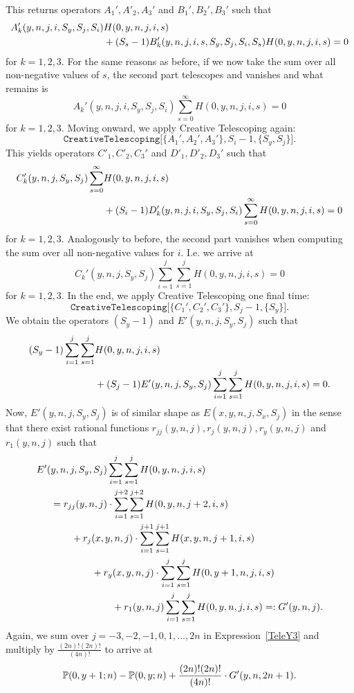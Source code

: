 \documentclass{amsart}
\numberwithin{equation}{section}
\begin{document}
This returns operators $A_1',A'_2,A_3'$ and $B_1',B_2',B_3'$ such that
\begin{align}
      A_k'(y,n,j,i,S_y,S_j,S_i)&H(0,y,n,j,i,s)\notag\\
    &{}+(S_s-1)B_k'(y,n,j,i,s,S_y,S_j,S_i,S_s)H(0,y,n,j,i,s)=0 \notag
\end{align}
for $k=1,2,3$. For the same reasons as before, if we now take the sum over all non-negative values of $s$, the second part telescopes and vanishes and what remains is
\[A_k'(y,n,j,i,S_y,S_j,S_i)\sum_{s=0}^\infty H(0,y,n,j,i,s)=0\]
for $k=1,2,3$. Moving onward, we apply Creative Telescoping again:
\[\texttt{CreativeTelescoping[}\{A_1',A_2',A_3'\},S_i-1,\{S_y,S_j\}\texttt{]}.\]
This yields operators $C'_1,C'_2,C_3'$ and $D'_1,D'_2,D_3'$ such that 
\begin{align}
    C_k'(y,n,j,S_y,S_j)\sum_{s=0}^\infty &H(0,y,n,j,i,s)\notag\\
    &+(S_i-1)D_k'(y,n,j,i,S_y,S_j,S_i)\sum_{s=0}^\infty H(0,y,n,j,i,s)=0\notag
\end{align}
for $k=1,2,3$. Analogously to before, the second part vanishes when computing the sum over all non-negative values for $i$. I.e. we arrive at
\[C_k'(y,n,j,S_y,S_j)\sum_{i=1}^j\sum_{s=1}^jH(0,y,n,j,i,s)=0\]
for $k=1,2,3$. In the end, we apply Creative Telescoping one final time:
\[\texttt{CreativeTelescoping[}\{C_1',C_2',C_3'\},S_j-1,\{S_y\}\texttt{]}.\]
We obtain the operators $(S_y-1)$ and $E'(y,n,j,S_y,S_j)$ such that
\begin{align}
    (S_y-1)\sum_{i=1}^j\sum_{s=1}^j &H(0,y,n,j,i,s)\notag\\
    &+(S_j-1)E'(y,n,j,S_y,S_j)\sum_{i=1}^j\sum_{s=1}^j H(0,y,n,j,i,s)=0. \label{TeleY3}
\end{align}
Now, $E'(y,n,j,S_y,S_j)$ is of similar shape as $E(x,y,n,j,S_x,S_j)$ in the sense that there exist rational functions $r_{jj}(y,n,j),r_j(y,n,j),r_y(y,n,j)$ and $r_1(y,n,j)$ such that
\begin{align}
     E'(&y,n,j,S_y,S_j)\sum_{i=1}^j\sum_{s=1}^j H(0,y,n,j,i,s)\notag\\
     &=r_{jj}(y,n,j)\cdot \sum_{i=1}^{j+2}\sum_{s=1}^{j+2} H(0,y,n,j+2,i,s)\notag\\
     &\hphantom{aaaa}+r_{j}(x,y,n,j)\cdot  \sum_{i=1}^{j+1}\sum_{s=1}^{j+1} H(x,y,n,j+1,i,s)\notag\\
     &\hphantom{aaaaaaaa}+r_{y}(x,y,n,j)\cdot \sum_{i=1}^j\sum_{s=1}^j H(0,y+1,n,j,i,s)\notag\\
     &\hphantom{aaaaaaaaaaaa}+r_1(y,n,j)\sum_{i=1}^j\sum_{s=1}^j H(0,y,n,j,i,s)=:G'(y,n,j)\notag.
\end{align}
Again, we sum over $j=-3,-2,-1,0,1,\dots, 2n$ in Expression~\eqref{TeleY3} and multiply by $\frac{(2n)!(2n)!}{(4n)!}$ to arrive at
\begin{align}
    \mathbb{P}(0,y+1;n)-\mathbb{P}(0,y;n)+\frac{(2n)!(2n)!}{(4n)!}\cdot G'(y,n,2n+1). \notag
\end{align}
\end{document}
